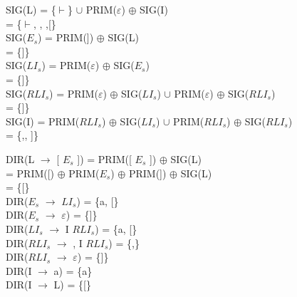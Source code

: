 \documentclass[\main/ApuntesPL.tex]{subfiles}
\begin{document}
\begin{center}
      \vspace{5mm}
      \begin{minipage}{.75\textwidth}
        SIG(L) = \{$\vdash$\} $\cup$ PRIM($\varepsilon$) $\oplus$ SIG(I)\\
        \hspace*{13.5mm}= \{$\vdash$, {\LARGE ,} ,[\}\\
        SIG($E_s$) = PRIM(]) $\oplus$ SIG(L)\\
        \hspace*{15.5mm}= \{]\}\\
        SIG($LI_s$) = PRIM($\varepsilon$) $\oplus$ SIG($E_s$)\\
        \hspace*{17mm}= \{]\}\\
        SIG($RLI_s$) = PRIM($\varepsilon$) $\oplus$ SIG($LI_s$) $\cup$ PRIM($\varepsilon$)
          $\oplus$ SIG($RLI_s$)\\
        \hspace*{20mm}= \{]\}\\
        SIG(I) = PRIM($RLI_s$) $\oplus$ SIG($LI_s$) $\cup$ PRIM($RLI_s$) $\oplus$ SIG($RLI_s$)\\
        \hspace*{12mm}= \{{\LARGE ,}, ]\}\\
      \end{minipage}

      \vspace{5mm}
      \begin{minipage}{.75\textwidth}
        DIR(L $\rightarrow$ [ $E_s$ ]) = PRIM([ $E_s$ ]) $\oplus$ SIG(L)\\
        \hspace*{29.5mm}= PRIM([) $\oplus$ PRIM($E_s$) $\oplus$ PRIM(]) $\oplus$ SIG(L)\\
        \hspace*{29.5mm}= \{[\}\\
        DIR($E_s$ $\rightarrow$ $LI_s$) = \{a, [\}\\
        DIR($E_s$ $\rightarrow$ $\varepsilon$) = \{]\}\\
        DIR($LI_s$ $\rightarrow$ I $RLI_s$) = \{a, [\}\\
        DIR($RLI_s$ $\rightarrow$ , I $RLI_s$) = \{{\LARGE ,}\}\\
        DIR($RLI_s$ $\rightarrow$ $\varepsilon$) = \{]\}\\
        DIR(I $\rightarrow$ a) = \{a\}\\
        DIR(I $\rightarrow$ L) = \{[\}
      \end{minipage}
    \end{center}
\end{document}
